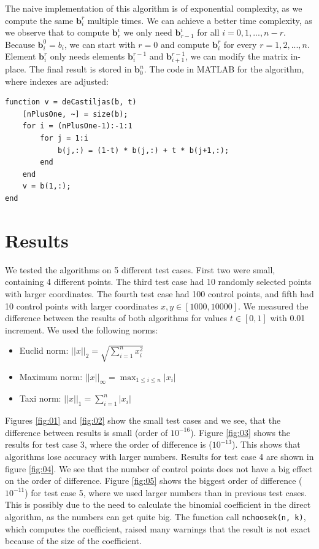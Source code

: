 \documentclass[]{article}
\begin{document}
The naive implementation of this algorithm is of exponential complexity, as we compute the same  $\textbf{b}_i^r$ multiple times. We can achieve a better time complexity, as we observe that to compute $\textbf{b}_r^i$ we only need $\textbf{b}_{r-1}^i$ for all $i = 0, 1, ..., n - r$. Because $\textbf{b}_i^0 = b_i$, we can start with $r = 0$ and compute $\textbf{b}_i^r$ for every $r = 1, 2, ..., n$. Element $\textbf{b}^r_i$ only needs elements $\textbf{b}^{r-1}_i$ and $\textbf{b}^{r-1}_{i+1}$, we can modify the matrix in-place. The final result is stored in $\textbf{b}^n_0$. The code in MATLAB for the algorithm, where indexes are adjusted:

\begin{lstlisting}
function v = deCastiljas(b, t)
    [nPlusOne, ~] = size(b);
    for i = (nPlusOne-1):-1:1
        for j = 1:i
            b(j,:) = (1-t) * b(j,:) + t * b(j+1,:);
        end
    end
    v = b(1,:);
end
\end{lstlisting}


\section{Results}

We tested the algorithms on 5 different test cases. First two were small, containing 4 different points. The third test case had 10 randomly selected points with larger coordinates. The fourth test case had 100 control points, and fifth had 10 control points with larger coordinates $x, y \in [1000, 10000]$. We measured the difference between the results of both algorithms for values $t \in [0, 1]$ with 0.01 increment. We used the following norms:
\begin{itemize}
	\item Euclid norm: $\lvert \lvert x \rvert \rvert_2 = \sqrt{\sum_{i = 1}^{n} x_i^2}$
	\item Maximum norm: $\lvert \lvert x \rvert \rvert_\infty = \max_{1 \leq i \leq n} \lvert x_i \rvert$
	\item Taxi norm: $\lvert \lvert x \rvert \rvert_1 = \sum_{i = 1}^{n} \lvert x_i \rvert$
\end{itemize}

Figures \ref{fig:01} and \ref{fig:02} show the small test cases and we see, that the difference between results is small (order of $10^{-16}$). Figure \ref{fig:03} shows the results for test case 3, where the order of difference is ($10^{-13}$). This shows that algorithms lose accuracy with larger numbers. Results for test case 4 are shown in figure \ref{fig:04}. We see that the number of control points does not have a big effect on the order of difference. Figure \ref{fig:05} shows the biggest order of difference ($10^{-11}$) for test case 5, where we used larger numbers than in previous test cases. This is possibly due to the need to calculate the binomial coefficient in the direct algorithm, as the numbers can get quite big. The function call \verb|nchoosek(n, k)|, which computes the coefficient, raised many warnings that the result is not exact because of the size of the coefficient.
\end{document}
